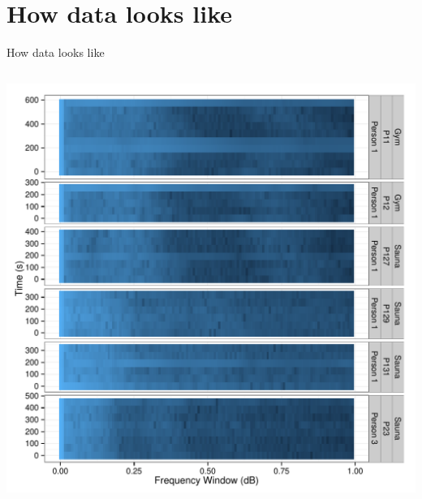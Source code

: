 \documentclass[newPxFont]{beamer}\usepackage[]{graphicx}\usepackage[]{color}
\makeatletter
\def\maxwidth{ %
  \ifdim\Gin@nat@width>\linewidth
    \linewidth
  \else
    \Gin@nat@width
  \fi
}
\newenvironment{knitrout}{}{} %
\makeatother
\begin{document}
\section{How data looks like}



\begin{frame}[t]{How data looks like}
\begin{columns}[t]
\begin{knitrout}
\color{fgcolor}
\includegraphics[width=\maxwidth]{figure/dataVizPrint-1} 

\end{knitrout}
\end{columns}
\end{frame}
\end{document}
